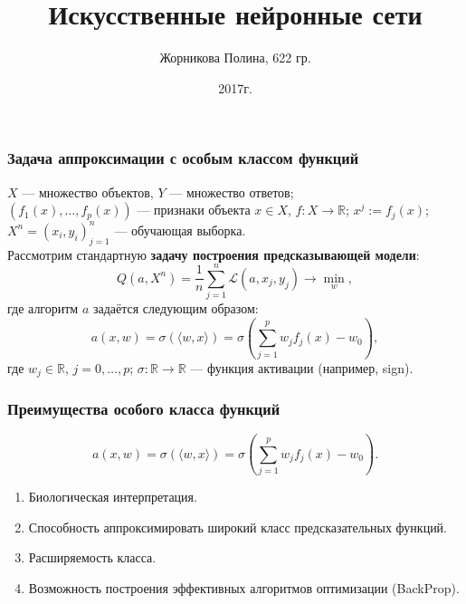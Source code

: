\documentclass[10pt]{beamer}
\title{Искусственные нейронные сети}
\author[Жорникова Полина] %
{Жорникова Полина, 622 гр.}
\date{2017г.}
\begin{document}
\frame[plain]{\titlepage}

\begin{frame}
\frametitle{Задача аппроксимации с особым классом функций}
$X$ --- множество объектов, $Y$ --- множество ответов;\\
 $(f_1(x),\ldots,f_p(x))$ --- признаки объекта $x \in X$, $f: X \rightarrow \mathbb{R}$; $x^j:= f_j(x)$;\\
 $X^n = (x_i, y_i)_{j=1}^{n}$ --- обучающая выборка.\\
\vspace{1cm}
Рассмотрим стандартную \textbf{задачу построения предсказывающей модели}:
\begin{equation*}
 Q(a, X^n) = \frac{1}{n} \sum_{j=1}^{n} \mathscr{L}(a,x_j,y_j) \rightarrow \min_w,
\end{equation*}
где алгоритм $a$ задаётся следующим образом:
\begin{equation*}
a(x, w) = \sigma( \langle w,x \rangle ) = \sigma\left(\sum_{j=1}^{p} w_j f_j(x) - w_0 \right),
\end{equation*}
где 
 $w_j \in \mathbb{R}$, $j=0,\ldots,p$; 
 $\sigma: \mathbb{R} \rightarrow  \mathbb{R} $ --- функция активации (например, sign).
\end{frame}

\begin{frame}
\frametitle{Преимущества особого класса функций}
\begin{equation*}
a(x, w) = \sigma( \langle w,x \rangle ) = \sigma\left(\sum_{j=1}^{p} w_j f_j(x) - w_0 \right).
\end{equation*}
\vspace{0.7cm}
\begin{enumerate}
\item Биологическая интерпретация.
\item Способность аппроксимировать широкий класс предсказательных функций.
\item Расширяемость класса.
\item Возможность построения эффективных алгоритмов оптимизации (BackProp).
\end{enumerate}
\end{frame}
\end{document}
